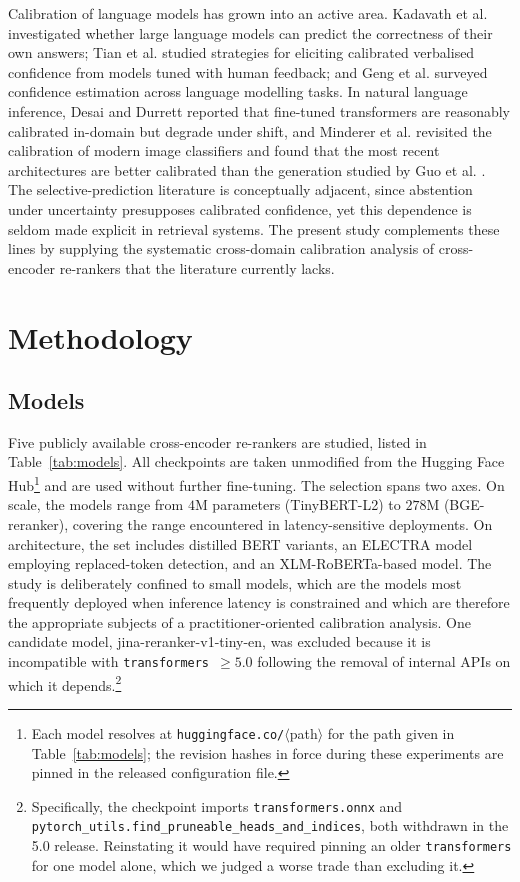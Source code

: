 \documentclass[sn-mathphys-num,pdflatex]{sn-jnl}
\begin{document}
Calibration of language models has grown into an active area. Kadavath et al.
\cite{kadavath2022} investigated whether large language models can predict the
correctness of their own answers; Tian et al. \cite{tian2023} studied strategies
for eliciting calibrated verbalised confidence from models tuned with human
feedback; and Geng et al. \cite{geng2024survey} surveyed confidence estimation
across language modelling tasks. In natural language inference, Desai and Durrett
\cite{desai2020} reported that fine-tuned transformers are reasonably calibrated
in-domain but degrade under shift, and Minderer et al. \cite{minderer2021}
revisited the calibration of modern image classifiers and found that the most
recent architectures are better calibrated than the generation studied by Guo et
al. \cite{guo2017}. The selective-prediction literature
\cite{geifman2017,el2010} is conceptually adjacent, since abstention under
uncertainty presupposes calibrated confidence, yet this dependence is seldom made
explicit in retrieval systems. The present study complements these lines by
supplying the systematic cross-domain calibration analysis of cross-encoder
re-rankers that the literature currently lacks.

\section{Methodology}\label{sec:method}

\subsection{Models}\label{sec:models}
Five publicly available cross-encoder re-rankers are studied, listed in
Table~\ref{tab:models}. All checkpoints are taken unmodified from the Hugging Face
Hub\footnote{Each model resolves at \texttt{huggingface.co/}$\langle$path$\rangle$
for the path given in Table~\ref{tab:models}; the revision hashes in force during
these experiments are pinned in the released configuration file.} and are used
without further fine-tuning. The selection spans two axes. On scale, the models range
from $4$M parameters (TinyBERT-L2) to $278$M (BGE-reranker), covering the range
encountered in latency-sensitive deployments. On architecture, the set includes
distilled BERT variants, an ELECTRA model employing replaced-token detection, and
an XLM-RoBERTa-based model. The study is deliberately confined to small models,
which are the models most frequently deployed when inference latency is
constrained and which are therefore the appropriate subjects of a
practitioner-oriented calibration analysis. One candidate model,
jina-reranker-v1-tiny-en, was excluded because it is incompatible with
\texttt{transformers}~$\geq 5.0$ following the removal of internal APIs on which
it depends.\footnote{Specifically, the checkpoint imports
\texttt{transformers.onnx} and
\texttt{pytorch\_utils.\allowbreak find\_pruneable\_heads\_and\_indices}, both withdrawn
in the
5.0 release. Reinstating it would have required pinning an older
\texttt{transformers} for one model alone, which we judged a worse trade than
excluding it.}
\end{document}
